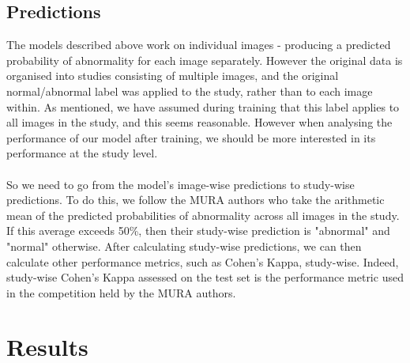 \documentclass[11pt]{article} %
\theoremstyle{plain}
\theoremstyle{definition}
\begin{document}
\subsection{Predictions}
The models described above work on individual images - producing a predicted probability of abnormality for each image separately. However the original data is organised into studies consisting of multiple images, and the original normal/abnormal label was applied to the study, rather than to each image within. As mentioned, we have assumed during training that this label applies to all images in the study, and this seems reasonable. However when analysing the performance of our model after training, we should be more interested in its performance at the study level. 
\\
\\
\noindent
So we need to go from the model's image-wise predictions to study-wise predictions. To do this, we follow the MURA authors \cite{MURA2017} who take the arithmetic mean of the predicted probabilities of abnormality across all images in the study. If this average exceeds 50\%, then their study-wise prediction is "abnormal" and "normal" otherwise. After calculating study-wise predictions, we can then calculate other performance metrics, such as Cohen's Kappa, study-wise. Indeed, study-wise Cohen's Kappa assessed on the test set is the performance metric used in the competition held by the MURA authors.



\newpage
\section{Results}
\end{document}
